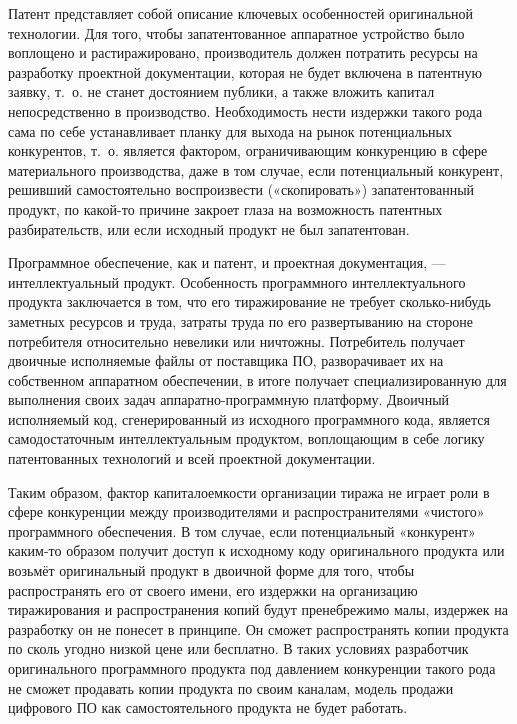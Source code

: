 \documentclass{article}
\begin{document}
Патент представляет собой описание ключевых особенностей оригинальной технологии. Для того, чтобы запатентованное аппаратное устройство было воплощено и растиражировано, производитель должен потратить ресурсы на разработку проектной документации, которая не будет включена в патентную заявку, т.~о. не станет достоянием публики, а также вложить капитал непосредственно в производство. Необходимость нести издержки такого рода сама по себе устанавливает планку для выхода на рынок потенциальных конкурентов, т.~о. является фактором, ограничивающим конкуренцию в сфере материального производства, даже в том случае, если потенциальный конкурент, решивший самостоятельно воспроизвести («скопировать») запатентованный продукт, по какой-то причине закроет глаза на возможность патентных разбирательств, или если исходный продукт не был запатентован.

Программное обеспечение, как и патент, и проектная документация, — интеллектуальный продукт. Особенность программного интеллектуального продукта заключается в том, что его тиражирование не требует сколько-нибудь заметных ресурсов и труда, затраты труда по его развертыванию на стороне потребителя относительно невелики или ничтожны. Потребитель получает двоичные исполняемые файлы от поставщика ПО, разворачивает их на собственном аппаратном обеспечении, в итоге получает специализированную для выполнения своих задач аппаратно-программную платформу. Двоичный исполняемый код, сгенерированный из исходного программного кода, является самодостаточным интеллектуальным продуктом, воплощающим в себе логику патентованных технологий и всей проектной документации.

Таким образом, фактор капиталоемкости организации тиража не играет роли в сфере конкуренции между производителями и распространителями «чистого» программного обеспечения. В том случае, если потенциальный «конкурент» каким-то образом получит доступ к исходному коду оригинального продукта или возьмёт оригинальный продукт в двоичной форме для того, чтобы распространять его от своего имени, его издержки на организацию тиражирования и распространения копий будут пренебрежимо малы, издержек на разработку он не понесет в принципе. Он сможет распространять копии продукта по сколь угодно низкой цене или бесплатно. В таких условиях разработчик оригинального программного продукта под давлением конкуренции такого рода не сможет продавать копии продукта по своим каналам, модель продажи цифрового ПО как самостоятельного продукта не будет работать.
\end{document}

